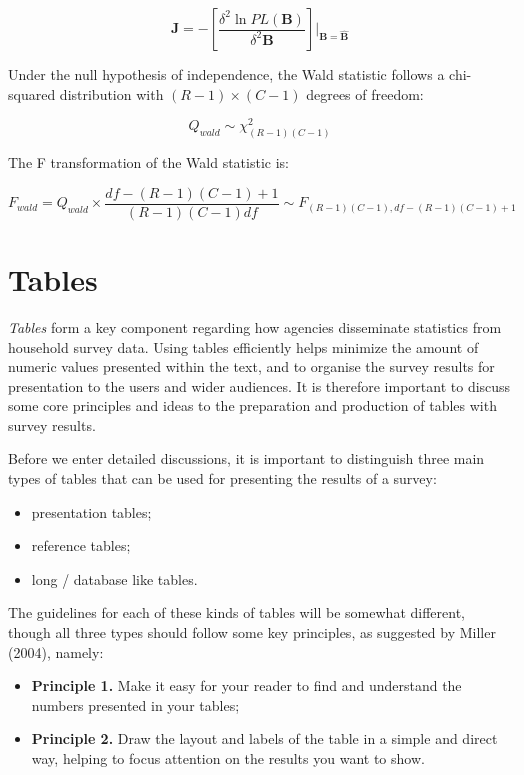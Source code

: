 \documentclass[
  12pt,
]{book}
\begin{document}
\[
\boldsymbol{J} = -\left[\frac{\delta^{2} \ln PL\left(\boldsymbol{B}\right)}{\delta^{2} \boldsymbol{B}}\right] \bigg|_{\boldsymbol{B} = \hat{\boldsymbol{B}}}
\]

Under the null hypothesis of independence, the Wald statistic follows a chi-squared distribution with \((R-1) \times (C-1)\) degrees of freedom:

\[
Q_{wald} \sim \chi^{2}_{(R-1)(C-1)}
\]

The F transformation of the Wald statistic is:

\[
F_{wald} = Q_{wald} \times \frac{df - (R-1)(C-1) + 1}{(R-1)(C-1) df} \sim F_{(R-1)(C-1), df - (R-1)(C-1) + 1}
\]

\hypertarget{tables}{%
\chapter{Tables}\label{tables}}

\emph{Tables} form a key component regarding how agencies disseminate statistics from household survey data. Using tables efficiently helps minimize the amount of numeric values presented within the text, and to organise the survey results for presentation to the users and wider audiences. It is therefore important to discuss some core principles and ideas to the preparation and production of tables with survey results.

Before we enter detailed discussions, it is important to distinguish three main types of tables that can be used for presenting the results of a survey:

\begin{itemize}
\item
  presentation tables;
\item
  reference tables;
\item
  long / database like tables.
\end{itemize}

The guidelines for each of these kinds of tables will be somewhat different, though all three types should follow some key principles, as suggested by Miller (2004), namely:

\begin{itemize}
\item
  \textbf{Principle 1.} Make it easy for your reader to find and understand the numbers presented in your tables;
\item
  \textbf{Principle 2.} Draw the layout and labels of the table in a simple and direct way, helping to focus attention on the results you want to show.
\end{itemize}
\end{document}
